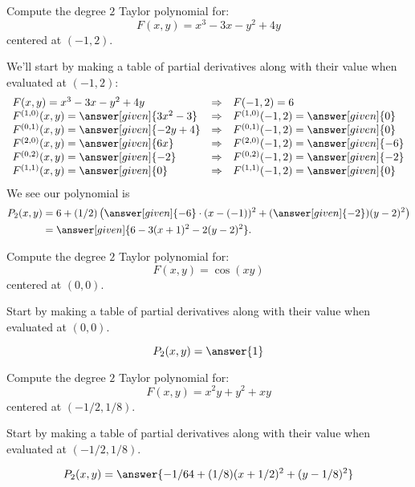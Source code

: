 \documentclass{ximera}
\begin{document}
\begin{example}
  Compute the degree $2$ Taylor polynomial for:
  \[
  F(x,y)= x^3-3x-y^2+4y
  \]
  centered at $(-1,2)$.
  \begin{explanation}
    We'll start by making a table of partial derivatives along with
    their value when evaluated at $(-1,2)$:
    \[
    \begin{array}{lcl}
      F(x,y) = x^3-3x-y^2+4y & \Rightarrow &F(-1,2) = 6\\
      F^{(1,0)}(x,y) = \answer[given]{3x^2-3} & \Rightarrow & F^{(1,0)}(-1,2) = \answer[given]{0}\\
      F^{(0,1)}(x,y) = \answer[given]{-2y+4} &\Rightarrow  & F^{(0,1)}(-1,2) = \answer[given]{0}\\
      F^{(2,0)}(x,y) = \answer[given]{6x} &\Rightarrow & F^{(2,0)}(-1,2) = \answer[given]{-6}\\
      F^{(0,2)}(x,y) = \answer[given]{-2} &\Rightarrow & F^{(0,2)}(-1,2) = \answer[given]{-2}\\
      F^{(1,1)}(x,y) = \answer[given]{0} &\Rightarrow & F^{(1,1)}(-1,2) = \answer[given]{0}
    \end{array}
    \]
    We see our polynomial is
    \begin{align*}
      P_2(x,y) &= 6 + (1/2)\left(\answer[given]{-6}\cdot (x-(-1))^2 +  (\answer[given]{-2})(y-2)^2 \right)\\
      &= \answer[given]{6-3(x+1)^2-2(y-2)^2}.
    \end{align*}
  \end{explanation}
\end{example}

\begin{question}
  Compute the degree $2$ Taylor polynomial for:
  \[
  F(x,y)=\cos(xy)
  \]
  centered at $(0,0)$.
  \begin{hint}
    Start by making a table of partial derivatives along with
    their value when evaluated at $(0,0)$.
  \end{hint}
    \begin{prompt}
    \[
    P_2(x,y) = \answer{1}
    \]
  \end{prompt}
\end{question}

\begin{question}
  Compute the degree $2$ Taylor polynomial for:
  \[
  F(x,y)= x^2 y + y^2 + x y
  \]
  centered at $(-1/2,1/8)$.
  \begin{hint}
    Start by making a table of partial derivatives along with
    their value when evaluated at $(-1/2,1/8)$.
  \end{hint}
  \begin{prompt}
    \[
    P_2(x,y) = \answer{-1/64 + (1/8)(x+1/2)^2+(y-1/8)^2}
    \]
  \end{prompt}
\end{question}
\end{document}
